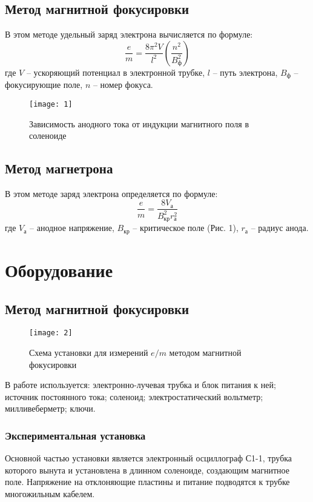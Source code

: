\subsection*{Метод магнитной фокусировки}
В этом методе удельный заряд электрона вычисляется по формуле:
\begin{equation}
    \frac{e}{m} = \frac{8\pi^2 V}{l^2}\left(\frac{n^2}{B_\text{ф}^2}\right)
\end{equation}
где $V$ -- ускоряющий потенциал в электронной трубке, $l$ -- путь электрона, $B_\text{ф}$ --
фокусирующие поле, $n$ -- номер фокуса.

\begin{wrapfigure}{r}{0.33\linewidth}
    \texttt{[image: 1]}
    \captionsetup{justification=centering}
    \caption{Зависимость анодного тока от индукции магнитного поля в соленоиде}
\end{wrapfigure}
\subsection*{Метод магнетрона}
В этом методе заряд электрона определяется по формуле:
\begin{equation}
    \frac{e}{m} = \frac{8V_\text{а}}{B_\text{кр}^2 r_\text{а}^2}
\end{equation}
где $V_\text{а}$ -- анодное напряжение, $B_\text{кр}$ -- критическое поле (Рис. 1), $r_\text{а}$ --
радиус анода.

\section{Оборудование}
\subsection*{Метод магнитной фокусировки}
\begin{wrapfigure}[21]{l}{0.3\linewidth}
    \texttt{[image: 2]}
    \captionsetup{justification=centering}
    \caption{Схема установки для измерений $e/m$ методом магнитной фокусировки}
\end{wrapfigure}
В работе используется: электронно-лучевая трубка и блок питания к ней; источник постоянного тока;
соленоид; электростатический вольтметр; милливеберметр; ключи.

\subsubsection*{Экспериментальная установка}
Основной частью установки является электронный осциллограф С1-1, трубка которого вынута и
установлена в длинном соленоиде, создающим магнитное поле. Напряжение на отклоняющие пластины и
питание подводятся к трубке многожильным кабелем.

